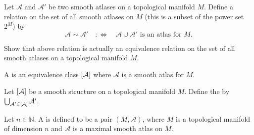 Let $\mathcal{A}$ and $\mathcal{A}'$ be two smooth atlases on a topological manifold $M$. Define a relation on the set of all smooth atlases on $M$ (this is a subset of the power set $2^M$) by
\begin{equation*}
	\mathcal{A} {\sim} \mathcal{A}' \quad :\Leftrightarrow \quad \mathcal{A} \cup \mathcal{A}' \text{ is an atlas for } M.
\end{equation*}

\begin{exercise}
	Show that above relation is actually an equivalence relation on the set of all smooth atlases on a topological manifold $M$.
\end{exercise}

\begin{definition}
	A  is an equivalence class $\sbr[0]{\mathcal{A}}$ where $\mathcal{A}$ is a smooth atlas for $M$.
\end{definition}

\begin{definition}
	Let $\sbr[0]{\mathcal{A}}$ be a smooth structure on a topological manifold $M$. Define the  by $\bigcup_{\mathcal{A}' \in \sbr[0]{\mathcal{A}}} \mathcal{A}'$.
\end{definition}

\begin{definition}
	Let $n \in \mathbb{N}$. A  is defined to be a pair $(M,\mathcal{A})$, where $M$ is a topological manifold of dimension $n$ and $\mathcal{A}$ is a maximal smooth atlas on $M$.
\end{definition}


